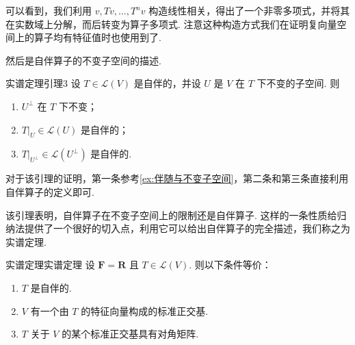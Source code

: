 可以看到，我们利用 $ v, Tv, \ldots , T^nv $ 构造线性相关，得出了一个非零多项式，并将其在实数域上分解，而后转变为算子多项式. 注意这种构造方式我们在证明复向量空间上的算子均有特征值时也使用到了.

然后是自伴算子的不变子空间的描述.

\begin{lemma}{}{实谱定理引理3}
    设 $ T \in \mathcal{L}(V) $ 是自伴的，并设 $ U $ 是 $ V $ 在 $ T $ 下不变的子空间. 则
    \begin{enumerate}
        \item $ U^{\perp} $ 在 $ T $ 下不变；

        \item $ T|_U \in \mathcal{L}(U) $ 是自伴的；

        \item $ T|_{U^{\perp }} \in \mathcal{L}(U^{\perp }) $ 是自伴的.
    \end{enumerate}
\end{lemma}

对于该引理的证明，第一条参考\autoref{ex:伴随与不变子空间}，第二条和第三条直接利用自伴算子的定义即可.

该引理表明，自伴算子在不变子空间上的限制还是自伴算子. 这样的一条性质给归纳法提供了一个很好的切入点，利用它可以给出自伴算子的完全描述，我们称之为实谱定理.

\begin{theorem}{实谱定理}{实谱定理} 
    设 $ \mathbf{F} = \mathbf{R} $ 且 $ T \in \mathcal{L}(V) $. 则以下条件等价：
    \begin{enumerate}
        \item \label{item:24:实谱定理:1}
              $ T $ 是自伴的.

        \item \label{item:24:实谱定理:2}
              $ V $ 有一个由 $ T $ 的特征向量构成的标准正交基.

        \item \label{item:24:实谱定理:3}
              $ T $ 关于 $ V $ 的某个标准正交基具有对角矩阵.
    \end{enumerate}
\end{theorem}

